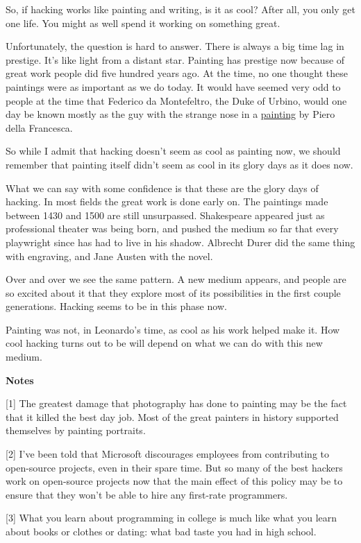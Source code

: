 So, if hacking works like painting and writing, is it as cool? After
all, you only get one life. You might as well spend it working on
something great.

Unfortunately, the question is hard to answer. There is always a big
time lag in prestige. It's like light from a distant star. Painting has
prestige now because of great work people did five hundred years ago. At
the time, no one thought these paintings were as important as we do
today. It would have seemed very odd to people at the time that Federico
da Montefeltro, the Duke of Urbino, would one day be known mostly as the
guy with the strange nose in a \href{montefeltro.html}{painting} by
Piero della Francesca.

So while I admit that hacking doesn't seem as cool as painting now, we
should remember that painting itself didn't seem as cool in its glory
days as it does now.

What we can say with some confidence is that these are the glory days of
hacking. In most fields the great work is done early on. The paintings
made between 1430 and 1500 are still unsurpassed. Shakespeare appeared
just as professional theater was being born, and pushed the medium so
far that every playwright since has had to live in his shadow. Albrecht
Durer did the same thing with engraving, and Jane Austen with the novel.

Over and over we see the same pattern. A new medium appears, and people
are so excited about it that they explore most of its possibilities in
the first couple generations. Hacking seems to be in this phase now.

Painting was not, in Leonardo's time, as cool as his work helped make
it. How cool hacking turns out to be will depend on what we can do with
this new medium.

\textbf{Notes}

{[}1{]} The greatest damage that photography has done to painting may be
the fact that it killed the best day job. Most of the great painters in
history supported themselves by painting portraits.

{[}2{]} I've been told that Microsoft discourages employees from
contributing to open-source projects, even in their spare time. But so
many of the best hackers work on open-source projects now that the main
effect of this policy may be to ensure that they won't be able to hire
any first-rate programmers.

{[}3{]} What you learn about programming in college is much like what
you learn about books or clothes or dating: what bad taste you had in
high school.

